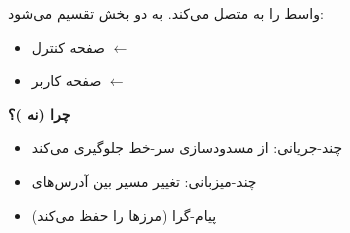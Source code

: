 واسط  را به  متصل می‌کند. به دو بخش تقسیم می‌شود:

\begin{itemize}
\tightlist
\item
   صفحه کنترل \ensuremath{\leftarrow} 
\item
   صفحه کاربر \ensuremath{\leftarrow} 
\end{itemize}




\textbf{چرا  (نه )؟}

\begin{itemize}
\tightlist
\item
  چند-جریانی: از مسدودسازی سر-خط جلوگیری می‌کند
\item
  چند-میزبانی: تغییر مسیر بین آدرس‌های 
\item
  پیام-گرا (مرزها را حفظ می‌کند)
\end{itemize}




\CNchained{}

